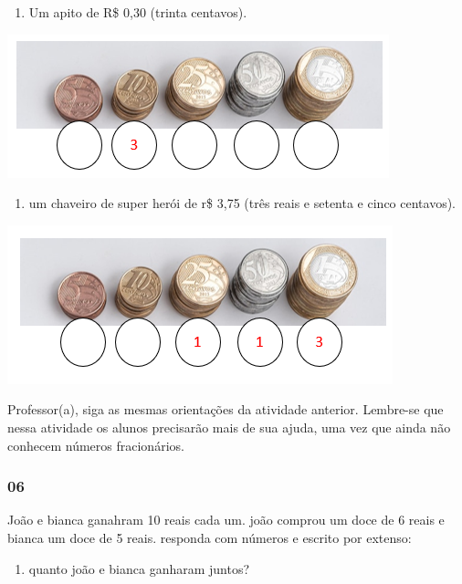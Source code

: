 \begin{enumerate}
\def\labelenumi{\Alph{enumi})}
\item
  Um apito de R\$ 0,30 (trinta centavos).
\end{enumerate}

\includegraphics[width=4.35477in,height=1.63565in]{media/image73.png}

\begin{enumerate}
\def\labelenumi{\Alph{enumi})}
\item
  um chaveiro de super herói de r\$ 3,75 (três reais e setenta e cinco
  centavos).
\end{enumerate}

\includegraphics[width=4.39645in,height=1.81275in]{media/image74.png}

Professor(a), siga as mesmas orientações da atividade anterior.
Lembre-se que nessa atividade os alunos precisarão mais de sua ajuda,
uma vez que ainda não conhecem números fracionários.

\subsubsection{06}\label{section-59}

João e bianca ganahram 10 reais cada um. joão comprou um doce de 6 reais
e bianca um doce de 5 reais. responda com números e escrito por extenso:

\begin{enumerate}
\def\labelenumi{\Alph{enumi})}
\item
  quanto joão e bianca ganharam juntos?
\end{enumerate}

